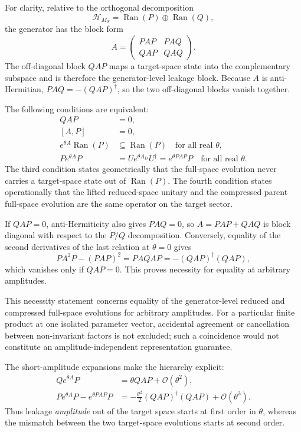 \documentclass[
 aip,
 jcp,
 amsmath,amssymb,
 preprint
]{revtex4-2}
\begin{document}
For clarity, relative to the orthogonal decomposition
\[
\mathcal H_{M_S}
=
\operatorname{Ran}(P)\oplus\operatorname{Ran}(Q),
\]
the generator has the block form
\[
A=
\begin{pmatrix}
PAP & PAQ\\
QAP & QAQ
\end{pmatrix}.
\]
The off-diagonal block $QAP$ maps a target-space state into the complementary subspace and is therefore the generator-level leakage block.
Because $A$ is anti-Hermitian,
$PAQ=-(QAP)^\dagger$, so the two off-diagonal blocks vanish together.

The following conditions are equivalent:
\begin{align}
QAP&=0,\\
[A,P]&=0,\\
e^{\theta A}\operatorname{Ran}(P)&\subseteq\operatorname{Ran}(P)
\quad\text{for all real }\theta,\\
P e^{\theta A}P
&=
Ue^{\theta A_D}U^\dagger
=
e^{\theta PAP}P
\quad\text{for all real }\theta.
\end{align}
The third condition states geometrically that the full-space evolution never carries a target-space state out of $\operatorname{Ran}(P)$.
The fourth condition states operationally that the lifted reduced-space unitary and the compressed parent full-space evolution are the same operator on the target sector.

If $QAP=0$, anti-Hermiticity also gives $PAQ=0$, so $A=PAP+QAQ$ is block diagonal with respect to the $P/Q$ decomposition.
Conversely, equality of the second derivatives of the last relation at $\theta=0$ gives
\begin{equation}
PA^2P-(PAP)^2
=
PAQAP
=
-(QAP)^\dagger(QAP),
\end{equation}
which vanishes only if $QAP=0$.
This proves necessity for equality at arbitrary amplitudes.

This necessity statement concerns equality of the generator-level reduced and compressed full-space evolutions for arbitrary amplitudes.
For a particular finite product at one isolated parameter vector, accidental agreement or cancellation between non-invariant factors is not excluded; such a coincidence would not constitute an amplitude-independent representation guarantee.

The short-amplitude expansions make the hierarchy explicit:
\begin{align}
Qe^{\theta A}P
&=
\theta QAP+\mathcal O(\theta^2),\\
Pe^{\theta A}P-e^{\theta PAP}P
&=
-\frac{\theta^2}{2}(QAP)^\dagger(QAP)
+\mathcal O(\theta^3).
\end{align}
Thus leakage \emph{amplitude} out of the target space starts at first order in $\theta$, whereas the mismatch between the two target-space evolutions starts at second order.
\end{document}
